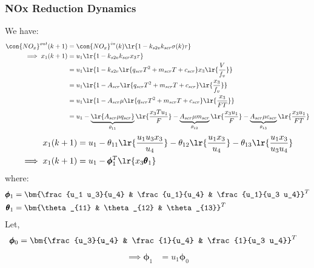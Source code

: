 \subsubsection{NOx Reduction Dynamics}
We have:
\begin{align*}
    \con{NO_x}^{out} (k + 1) &= \con{NO_x}^{in} (k) \lr{1 - k_{s2v} k_{scr} \sigma(k) \tau}\\
    \implies x_1 (k+1) &= u_1 \lr{1 - k_{s2v} k_{scr} x_3 \tau}\\
                    &= u_1 \lr{1 - k_{s2v}\lr{q_{scr} T^2 + m_{scr}T + c_{scr}} x_3 \lr{\frac{V}{f_v}}}\\
                    &= u_1 \lr{1 - A_{scr}\lr{ q_{scr} T^2 + m_{scr}T + c_{scr}} \lr{\frac{x_3}{f_v}}}\\
                    &= u_1 \lr{1 - A_{scr}\mu \lr{ q_{scr} T^2 + m_{scr}T + c_{scr}} \lr{\frac{x_3}{F T}}}\\
                    &= u_1 - \underbrace{\lr{A_{scr} \mu q_{scr}}}_{\theta_{11}} \lr{ \frac{x_3 T u_1}{F}}
                                 - \underbrace{A_{scr} \mu m_{scr}}_{\theta_{12}} \lr{ \frac{x_3 u_1}{F}}
                                 - \underbrace{A_{scr} \mu c_{scr}}_{\theta_{13}} \lr{ \frac{x_3 u_1}{FT}}
\end{align*}
\begin{align}
    x_1(k+1)  &= u_1 - \theta_{11} \lr{\frac{u_1 u_3 x_3}{u_4}}
                                     - \theta_{12} \lr{\frac{u_1 x_3}{u_4}}
                                     - \theta_{13} \lr{\frac{u_1 x_3}{u_3 u_4}}\\
    \implies x_1(k + 1) &= u_1 - \pmb \phi_1^T \lr{x_3 \pmb \theta_1} \label{eq::nox_proc}
\end{align}
where:
\begin{align*}
    \pmb \phi_1 &= \bm{\frac{u_1 u_3}{u_4} & \frac{u_1}{u_4} & \frac{u_1}{u_3 u_4}}^T\\
    \pmb \theta_1 &= \bm{\theta_{11} & \theta_{12} & \theta_{13}}^T
\end{align*}
Let,
\begin{align}
    \pmb \phi_0 &= \bm{\frac{u_3}{u_4} & \frac{1}{u_4} & \frac{1}{u_3 u_4}}^T
\end{align}
\begin{align*}
    \implies \pmb \phi_1 &= u_1 \pmb \phi_0
\end{align*}
